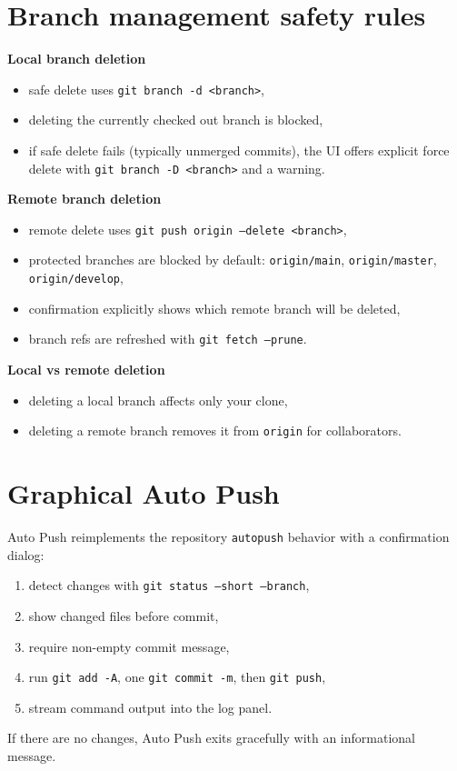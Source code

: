 \section{Branch management safety rules}
\textbf{Local branch deletion}
\begin{itemize}
  \item safe delete uses \texttt{git branch -d <branch>},
  \item deleting the currently checked out branch is blocked,
  \item if safe delete fails (typically unmerged commits), the UI offers explicit force delete with \texttt{git branch -D <branch>} and a warning.
\end{itemize}

\textbf{Remote branch deletion}
\begin{itemize}
  \item remote delete uses \texttt{git push origin --delete <branch>},
  \item protected branches are blocked by default: \texttt{origin/main}, \texttt{origin/master}, \texttt{origin/develop},
  \item confirmation explicitly shows which remote branch will be deleted,
  \item branch refs are refreshed with \texttt{git fetch --prune}.
\end{itemize}

\textbf{Local vs remote deletion}
\begin{itemize}
  \item deleting a local branch affects only your clone,
  \item deleting a remote branch removes it from \texttt{origin} for collaborators.
\end{itemize}

\section{Graphical Auto Push}
Auto Push reimplements the repository \texttt{autopush} behavior with a confirmation dialog:
\begin{enumerate}
  \item detect changes with \texttt{git status --short --branch},
  \item show changed files before commit,
  \item require non-empty commit message,
  \item run \texttt{git add -A}, one \texttt{git commit -m}, then \texttt{git push},
  \item stream command output into the log panel.
\end{enumerate}
If there are no changes, Auto Push exits gracefully with an informational message.

